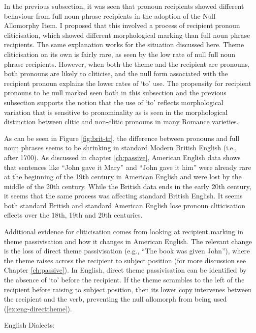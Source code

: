 	In the previous subsection, it was seen that pronoun recipients showed different behaviour from full noun phrase recipients in the adoption of the Null Allomorphy Item. I proposed that this involved a process of recipient pronoun cliticisation, which showed different morphological marking than full noun phrase recipients. The same explanation works for the situation discussed here. Theme cliticisation on its own is fairly rare, as seen by the low rate of null full noun phrase recipients. However, when both the theme and the recipient are pronouns, both pronouns are likely to cliticise, and the null form associated with the recipient pronoun explains the lower rates of `to' use. The propensity for recipient pronouns to be null marked seen both in this subsection and the previous subsection supports the notion that the use of `to' reflects morphological variation that is sensitive to pronominality as is seen in the morphological distinction between clitic and non-clitic pronouns in many Romance varieties.

	As can be seen in Figure \ref{fig:brit-tr}, the difference between pronouns and full noun phrases seems to be shrinking in standard Modern British English (i.e., after 1700). As discussed in chapter \ref{ch:passive}, American English data shows that sentences like ``John gave it Mary'' and ``John gave it him'' were already rare at the beginning of the 19th century in American English and were lost by the middle of the 20th century. While the British data ends in the early 20th century, it seems that the same process was affecting standard British English. It seems both standard British and standard American English lose pronoun cliticisation effects over the 18th, 19th and 20th centuries.

	Additional evidence for cliticisation comes from looking at recipient marking in theme passivisation and how it changes in American English. The relevant change is the loss of direct theme passivisation (e.g., ``The book was given John''), where the theme raises across the recipient to subject position (for more discussion see Chapter \ref{ch:passive}). In English, direct theme passivisation can be identified by the absence of `to' before the recipient. If the theme scrambles to the left of the recipient before raising to subject position, then its lower copy intervenes between the recipient and the verb, preventing the null allomorph from being used (\ref{ex:eng-directtheme}).

\begin{exe}
	 English Dialects:
		\begin{xlist}
		\end{xlist}
\end{exe}
	
